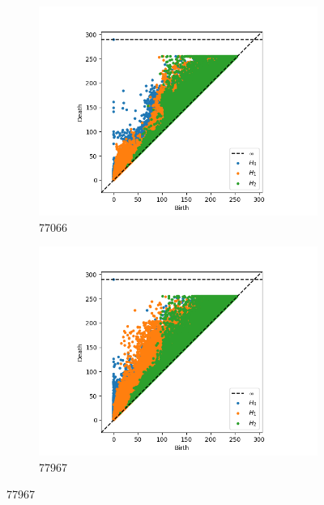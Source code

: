 \documentclass[10pt]{beamer}
\begin{document}
\begin{frame}[fragile]{}
\begin{figure}[ht]
\begin{subfigure}{.5 \linewidth}
    \includegraphics[scale=0.3]{persistence_diagrams/77066_multi_ph.png}
    \caption{77066}
  \end{subfigure}%
  \begin{subfigure}{.5 \linewidth}
    \includegraphics[scale=0.3]{persistence_diagrams/77967_multi_ph.png}
    \caption{77967}
  \end{subfigure}
\end{figure}
\end{frame}
\end{document}
